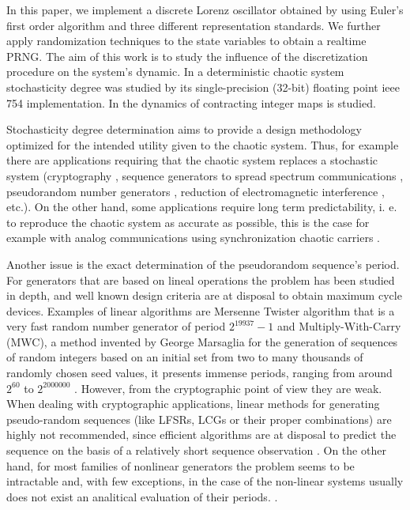 In this paper, we implement a discrete Lorenz oscillator obtained
by using Euler's first order algorithm and three different
representation standards. We further apply  randomization
techniques to the state variables to obtain a realtime PRNG. The
aim of this work is to study the influence of the discretization
procedure on the system's dynamic. In \cite{DeMicco2010}  a
deterministic chaotic system stochasticity degree was studied by
its single-precision (32-bit) floating point ieee 754
implementation. In \cite{Wolff1986} the dynamics of contracting
integer maps is studied.

Stochasticity degree determination aims to provide a design
methodology optimized for the intended utility given to the
chaotic system. Thus, for example there are applications requiring
that the chaotic system replaces a stochastic system (cryptography
\cite{Fernandez2003}, sequence generators to spread spectrum
communications \cite{Setti2004,DeMicco2007B}, pseudorandom number
generators \cite{Kocarev2003,Larrondo2006,DeMicco2009}, reduction
of electromagnetic interference \cite{Callegari2003A}, etc.). On
the other hand, some applications require long term
predictability, i. e. to reproduce the chaotic system as accurate
as possible, this is the case for example with analog
communications using synchronization chaotic carriers
\cite{Kocarev1995,Hidalgo2001}.

Another issue is the exact determination of the pseudorandom sequence's period.
For generators that are based on
lineal operations the problem has been studied
in depth, and well known design criteria are at disposal to obtain
maximum cycle devices.   Examples of  linear algorithms are Mersenne Twister algorithm that is a
very fast random number generator  of period $2^{19937}-1$
\cite{Matsumoto1998} and Multiply-With-Carry (MWC), a method
invented by George Marsaglia for the generation of sequences of
random integers based on an initial set from two to many thousands
of randomly chosen seed values, it presents immense periods,
ranging from around $2^{60}$ to $2^{2000000}$
\cite{Marsaglia1991}. However, from the cryptographic point of
view they are weak.  When dealing with cryptographic applications,
linear methods for generating pseudo-random sequences (like LFSRs,
LCGs or their proper combinations) are highly not recommended,
since efficient algorithms are at disposal to predict the sequence
on the basis of a relatively short sequence observation
\cite{Boyar1989,Plumstead1982}. On the other hand, for most families of
nonlinear generators the problem seems to be intractable and, with few
exceptions, in the case of the non-linear systems usually
does not  exist an analitical evaluation of their periods.
\cite{kocarev2011}.

